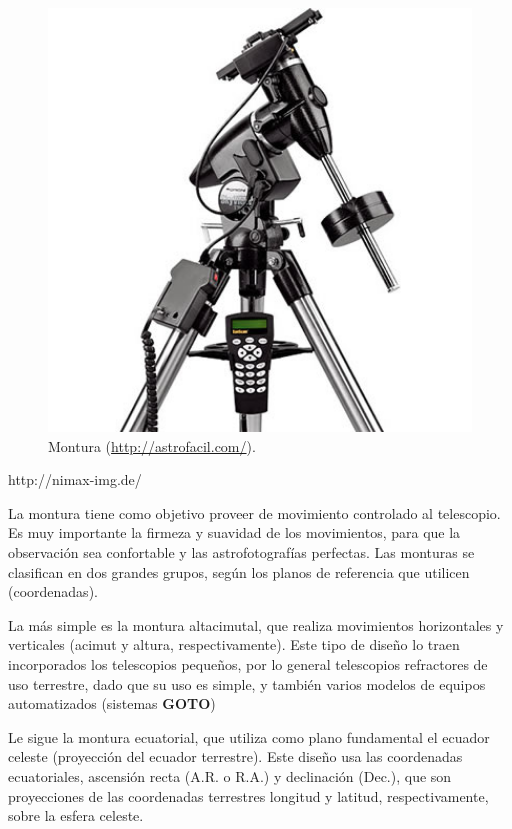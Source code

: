 \bigskip
\begin{figure}[!ht]
  \begin{center}
  \includegraphics[width=1\textwidth]{../images/montura.jpg}
  \caption{Montura (\url{http://astrofacil.com/}).}
  \label{fig:diag_scrum}
  \end{center}
\end{figure}
http://nimax-img.de/

\bigskip
La montura tiene como objetivo proveer de movimiento controlado al telescopio. Es muy importante la firmeza y suavidad de los movimientos, para que la observación sea confortable y las astrofotografías perfectas. Las monturas se clasifican en dos grandes grupos, según los planos de referencia que utilicen (coordenadas).

\bigskip
La más simple es la montura altacimutal, que realiza movimientos horizontales y verticales (acimut y altura, respectivamente). Este tipo de diseño lo traen incorporados los telescopios pequeños, por lo general telescopios refractores de uso terrestre, dado que su uso es simple, y también varios modelos de equipos automatizados (sistemas \textbf{GOTO})

\bigskip
Le sigue la montura ecuatorial, que utiliza como plano fundamental el ecuador celeste (proyección del ecuador terrestre). Este diseño usa las coordenadas ecuatoriales, ascensión recta (A.R. o R.A.) y declinación (Dec.), que son proyecciones de las coordenadas terrestres longitud y latitud, respectivamente, sobre la esfera celeste.

